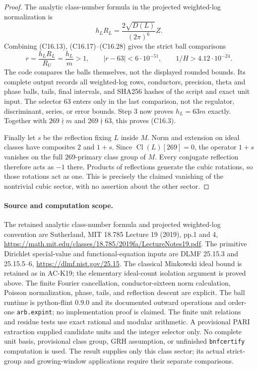 \begin{proof}
The analytic class-number formula in the projected weighted-log
normalization is
\[
 h_LR_L=\frac{2\sqrt{D(L)}}{(2\pi)^6}Z.
 \tag{C16.28}
\]
Combining (C16.13), (C16.17)--(C16.28) gives the strict ball
comparisons
\[
 r=\frac{h_LR_L}{R_U}=\frac{h_L}{m}>1,\qquad
 |r-63|<6\cdot10^{-51},\qquad
 1/H>4.12\cdot10^{-24}.
 \tag{C16.29}
\]
The code compares the balls themselves, not the displayed rounded
bounds.  Its complete output records all weighted-log rows,
conductors, precision, theta and phase balls, tails, final intervals,
and SHA256 hashes of the script and exact unit input.
The selector $63$ enters only in the last comparison, not the
regulator, discriminant, series, or error bounds.
Step 3 now proves $h_L=63m$ exactly.
Together with $269\nmid m$ and $269\nmid63$, this proves (C16.3).

Finally let $s$ be the reflection fixing $L$ inside $M$.
Norm and extension on ideal classes have composites $2$ and $1+s$.
Since $\operatorname{Cl}(L)[269]=0$, the operator $1+s$ vanishes
on the full $269$-primary class group of $M$.
Every conjugate reflection therefore acts as $-1$ there.
Products of reflections generate the cubic rotations, so those
rotations act as one.  This is precisely the claimed vanishing
of the nontrivial cubic sector, with no assertion about the other sector.
\end{proof}

\paragraph{Source and computation scope.}
The retained analytic class-number formula and projected weighted-log
convention are Sutherland, MIT 18.785 Lecture 19 (2019), pp.1 and 4,
\url{https://math.mit.edu/classes/18.785/2019fa/LectureNotes19.pdf}.
The primitive Dirichlet special-value and functional-equation inputs
are DLMF 25.15.3 and 25.15.5--6,
\url{https://dlmf.nist.gov/25.15}.
The classical Minkowski ideal bound is retained as in AC-K19;
the elementary ideal-count isolation argument is proved above.
The finite Fourier cancellation, conductor-sixteen norm calculation,
Poisson normalization, phase, tails, and reflection descent are explicit.
The ball runtime is python-flint 0.9.0 and its documented outward
operations and order-one \texttt{arb.expint}; no implementation proof
is claimed.  The finite unit relations and residue tests use exact
rational and modular arithmetic.
A provisional PARI extraction supplied candidate units and the integer
selector only.  No complete unit basis, provisional class group,
GRH assumption, or unfinished \texttt{bnfcertify} computation is used.
The result supplies only this class sector; its actual strict-group
and growing-window applications require their separate comparisons.
